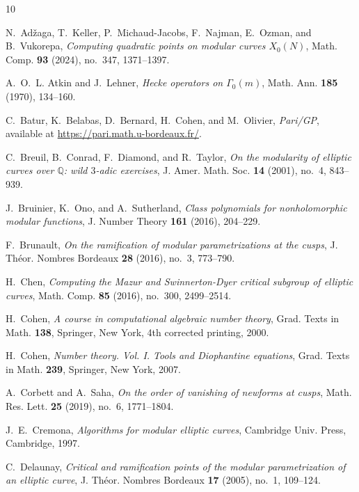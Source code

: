 \documentclass[10pt, a4paper]{article}
\begin{document}
\begin{thebibliography}{10}

N.~Ad\v{z}aga, T.~Keller, P.~Michaud-Jacobs, F.~Najman, E.~Ozman, and B.~Vukorepa,
\emph{Computing quadratic points on modular curves $X_0(N)$},
Math. Comp. \textbf{93} (2024), no.~347, 1371--1397.

A.~O.~L. Atkin and J.~Lehner,
\emph{Hecke operators on $\Gamma_0(m)$},
Math. Ann. \textbf{185} (1970), 134--160.

C.~Batur, K.~Belabas, D.~Bernard, H.~Cohen, and M.~Olivier,
\emph{Pari/GP},
available at \url{https://pari.math.u-bordeaux.fr/}.

C.~Breuil, B.~Conrad, F.~Diamond, and R.~Taylor,
\emph{On the modularity of elliptic curves over $\mathbb{Q}$: wild $3$-adic exercises},
J. Amer. Math. Soc. \textbf{14} (2001), no.~4, 843--939.

J.~Bruinier, K.~Ono, and A.~Sutherland,
\emph{Class polynomials for nonholomorphic modular functions},
J. Number Theory \textbf{161} (2016), 204--229.

F.~Brunault,
\emph{On the ramification of modular parametrizations at the cusps},
J. Th\'eor. Nombres Bordeaux \textbf{28} (2016), no.~3, 773--790.

H.~Chen,
\emph{Computing the Mazur and Swinnerton-Dyer critical subgroup of elliptic curves},
Math. Comp. \textbf{85} (2016), no.~300, 2499--2514.

H.~Cohen,
\emph{A course in computational algebraic number theory},
Grad. Texts in Math. \textbf{138}, Springer, New York,
4th corrected printing, 2000.

H.~Cohen,
\emph{Number theory. Vol. I. Tools and Diophantine equations},
Grad. Texts in Math. \textbf{239}, Springer, New York, 2007.

A.~Corbett and A.~Saha,
\emph{On the order of vanishing of newforms at cusps},
Math. Res. Lett. \textbf{25} (2019), no.~6, 1771--1804.

J.~E.~Cremona,
\emph{Algorithms for modular elliptic curves},
Cambridge Univ. Press, Cambridge, 1997.

C.~Delaunay,
\emph{Critical and ramification points of the modular parametrization of an elliptic curve},
J. Th\'eor. Nombres Bordeaux \textbf{17} (2005), no.~1, 109--124.


\end{thebibliography}
\end{document}
